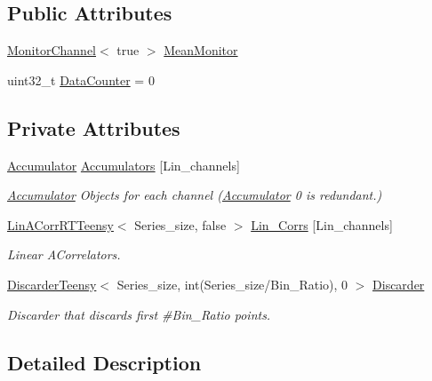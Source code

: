 \subsection*{Public Attributes}
\begin{DoxyCompactItemize}
\item 
\hyperlink{classMonitorChannel}{Monitor\+Channel}$<$ true $>$ \hyperlink{classMultiTauACorrRTTeensy_a88f0486f59451fb97a787741c80badf9}{Mean\+Monitor}
\item 
uint32\+\_\+t \hyperlink{classMultiTauACorrRTTeensy_ab2fa5a0800fa7d9ee52900ced06ce935}{Data\+Counter} = 0
\end{DoxyCompactItemize}
\subsection*{Private Attributes}
\begin{DoxyCompactItemize}
\item 
\hyperlink{classAccumulator}{Accumulator} \hyperlink{classMultiTauACorrRTTeensy_aac3d87dfb6b995e83e20f444d3d5eb0d}{Accumulators} \mbox{[}Lin\+\_\+channels\mbox{]}
\begin{DoxyCompactList}\small\item\em \hyperlink{classAccumulator}{Accumulator} Objects for each channel (\hyperlink{classAccumulator}{Accumulator} \textquotesingle{}0\textquotesingle{} is redundant.) \end{DoxyCompactList}\item 
\hyperlink{classLinACorrRTTeensy}{Lin\+A\+Corr\+R\+T\+Teensy}$<$ Series\+\_\+size, false $>$ \hyperlink{classMultiTauACorrRTTeensy_abd0498010dea716140e242ccbf426174}{Lin\+\_\+\+Corrs} \mbox{[}Lin\+\_\+channels\mbox{]}
\begin{DoxyCompactList}\small\item\em Linear A\+Correlators. \end{DoxyCompactList}\item 
\hyperlink{classDiscarderTeensy}{Discarder\+Teensy}$<$ Series\+\_\+size, int(Series\+\_\+size/Bin\+\_\+\+Ratio), 0 $>$ \hyperlink{classMultiTauACorrRTTeensy_ad7bd7663180cdc3702ada3e726486311}{Discarder}
\begin{DoxyCompactList}\small\item\em Discarder that discards first \#\+Bin\+\_\+\+Ratio points. \end{DoxyCompactList}\end{DoxyCompactItemize}


\subsection{Detailed Description}
